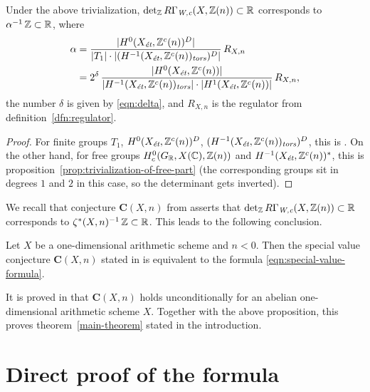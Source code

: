 \documentclass{article}
\numberwithin{equation}{section}
\begin{document}
\begin{proposition}
  Under the above trivialization, $\det_\ZZ R\Gamma_\Wc (X, \ZZ(n)) \subset \RR$
  corresponds to $\alpha^{-1}\,\ZZ \subset \RR$, where
  \begin{align*}
    \alpha & = \frac{|H^0 (X_\et, \ZZ^c(n))^D|}{|T_1| \cdot |(H^{-1} (X_\et, \ZZ^c(n))_\tors)^D|}\,R_{X,n} \\
           & = 2^\delta\,\frac{|H^0 (X_\et, \ZZ^c (n))|}{|H^{-1} (X_\et, \ZZ^c(n))_\tors|\cdot |H^1 (X_\et, \ZZ^c(n))|}\,R_{X,n},
  \end{align*}
  the number $\delta$ is given by \eqref{eqn:delta}, and $R_{X,n}$ is
  the regulator from definition~\ref{dfn:regulator}.

  \begin{proof}
    For finite groups $T_1$, $H^0 (X_\et, \ZZ^c(n))^D$,
    $(H^{-1} (X_\et, \ZZ^c(n))_\tors)^D$, this is
    \cite[Lemma~A.6]{Beshenov-Weil-etale-2}. On the other hand, for free groups
    $H^0_c (G_\RR, X(\CC), \ZZ(n))$ and $H^{-1} (X_\et, \ZZ^c (n))^*$,
    this is proposition~\ref{prop:trivialization-of-free-part} (the
    corresponding groups sit in degrees $1$ and $2$ in this case, so the
    determinant gets inverted).
  \end{proof}
\end{proposition}

We recall that conjecture $\mathbf{C} (X,n)$ from
\cite[\S 4]{Beshenov-Weil-etale-2} asserts that
$\det_\ZZ R\Gamma_\Wc (X, \ZZ(n)) \subset \RR$ corresponds to
$\zeta^* (X,n)^{-1}\,\ZZ \subset \RR$. This leads to the following conclusion.

\begin{proposition}
  Let $X$ be a one-dimensional arithmetic scheme and $n < 0$. Then the special
  value conjecture $\mathbf{C} (X,n)$ stated in \cite{Beshenov-Weil-etale-2} is
  equivalent to the formula \eqref{eqn:special-value-formula}.
\end{proposition}

It is proved in \cite[\S 7]{Beshenov-Weil-etale-2} that $\mathbf{C} (X,n)$ holds
unconditionally for an abelian one-dimensional arithmetic scheme $X$. Together
with the above proposition, this proves theorem~\ref{main-theorem} stated in the
introduction.


\section{Direct proof of the formula}
\label{sec:demystification}
\end{document}
